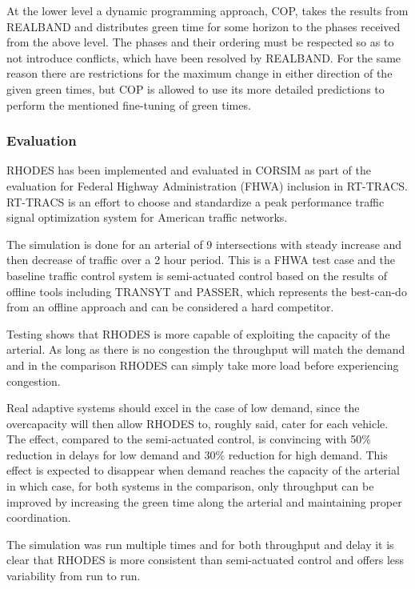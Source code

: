At the lower level a dynamic programming approach, COP, takes the
results from REALBAND and distributes green time for some horizon to
the phases received from the above level. The phases and their
ordering must be respected so as to not introduce conflicts, which
have been resolved by REALBAND. For the same reason there are
restrictions for the maximum change in either direction of the given
green times, but COP is allowed to use its more detailed predictions
to perform the mentioned fine-tuning of green times.

\subsubsection*{Evaluation}
RHODES has been implemented and evaluated in CORSIM as part of the
evaluation for Federal Highway Administration (FHWA) inclusion in
RT-TRACS. RT-TRACS is an effort to choose and standardize a peak
performance traffic signal optimization system for American traffic
networks.

The simulation is done for an arterial of 9 intersections with steady
increase and then decrease of traffic over a 2 hour period. This is a
FHWA test case and the baseline traffic control system is
semi-actuated control based on the results of offline tools including
TRANSYT and PASSER, which represents the best-can-do from an offline
approach and can be considered a hard competitor.

Testing shows that RHODES is more capable of exploiting the capacity
of the arterial. As long as there is no congestion the throughput will
match the demand and in the comparison RHODES can simply take more
load before experiencing congestion.

Real adaptive systems should excel in the case of low demand, since
the overcapacity will then allow RHODES to, roughly said, cater for
each vehicle. The effect, compared to the semi-actuated control, is
convincing with 50\% reduction in delays for low demand and 30\%
reduction for high demand. This effect is expected to disappear when
demand reaches the capacity of the arterial in which case, for both
systems in the comparison, only throughput can be improved by
increasing the green time along the arterial and maintaining proper
coordination.

The simulation was run multiple times and for both throughput and
delay it is clear that RHODES is more consistent than semi-actuated
control and offers less variability from run to run.
